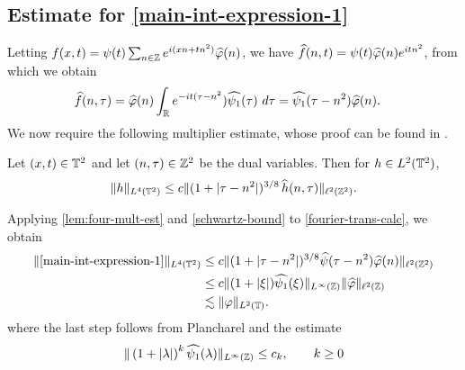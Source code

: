 \subsection{Estimate for \eqref{main-int-expression-1}}
Letting $f(x,t) = \psi(t) \sum_{n \in \mathbb{Z}} e^{i(xn + tn^2)} 
\widehat{\varphi}(n)$, we have $\widehat{f}(n,t) = \psi(t) \widehat{\varphi}(n) e^{itn^2}$,
from which we obtain
%
%
\begin{equation}
	\label{fourier-trans-calc}
	\begin{split}
		\widehat{f}(n, \tau)
		& = \widehat{\varphi}(n) \int_{\mathbb{R}} e^{-it( \tau - n^2}) 
		\widehat{\psi_1}(\tau) \ d\tau
		= \widehat{\psi_1}(\tau - n^2) \widehat{\varphi}(n).
	\end{split}
\end{equation}
%
%
We now require the following multiplier estimate, whose proof can be found in 
\cite{Bourgain-Fourier-transfo-1}. %
%
%
%
%
%
%
%
\begin{lemma}[Bourgain]
	\label{lem:four-mult-est}
	Let $(x, t) \in \mathbb{T}^2$ and let $(n, \tau) \in \mathbb{Z}^2$ 
	be the dual variables. Then for $h \in L^2(\mathbb{T}^2)$,
%
\begin{equation}
	\label{four-mult-est}
	\begin{split}
		\|h\|_{L^4(\mathbb{T}^2)} \le c \|(1 + |\tau - 
		n^2|)^{3/8} \, \widehat{h}(n, \tau) \|_{\ell^2(\mathbb{Z}^2)}.
	\end{split}
\end{equation}
%
%
\end{lemma}
%
%
%
%
%
%
%
Applying \cref{lem:four-mult-est} and \eqref{schwartz-bound} to
\eqref{fourier-trans-calc}, we obtain
%
%
\begin{equation}
	\label{main-int-est-part-1}
	\begin{split}
		\|\eqref{main-int-expression-1}\|_{L^4(\mathbb{T}^2)} 
		& \le c  \|(1 + |\tau - 
		n^2|)^{3/8} \widehat{\psi}(\tau - n^2) 		\widehat{\varphi}(n) \|_{\ell^2(\mathbb{Z}^2)}
		\\
		& \le c \|(1 + |\xi|)  \widehat{\psi_1}(\xi)\|_{L^\infty(\mathbb{Z})} 
		\|\widehat{\varphi} \|_{\ell^2(\mathbb{Z})}
		\\
		& \lesssim \|\varphi \|_{L^2(\mathbb{T})}.
	\end{split}
\end{equation}
where the last step follows from Plancharel and the estimate
%
%
\begin{equation}
	\label{schwartz-bound}
	\begin{split}
		\|\left( 1 + |\lambda| \right)^k \widehat{\psi_1}(\lambda) 
		\|_{L^\infty(\mathbb{Z})} \le c_k , \qquad k\ge0
	\end{split}
\end{equation}
